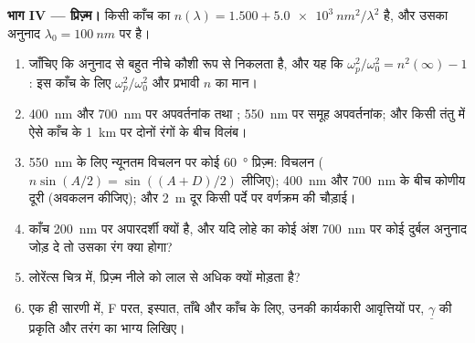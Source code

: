 \begin{problem}
\medskip
\noindent\textbf{भाग IV --- प्रिज़्म।}
किसी काँच का $n(\lambda) = 1.500 + \qty{5.0e3}{nm^2}/\lambda^2$ है, और उसका अनुनाद
$\lambda_0 = \qty{100}{nm}$ पर है।
\begin{enumerate}[resume]
  \item जाँचिए कि अनुनाद से बहुत नीचे कौशी रूप  से
        निकलता है, और यह कि $\omega_p^2/\omega_0^2 = n^2(\infty) - 1$: इस काँच के लिए
        $\omega_p^2/\omega_0^2$ और प्रभावी $n$ का मान।
  \item \qty{400}{nm} और \qty{700}{nm} पर अपवर्तनांक तथा ;
        \qty{550}{nm} पर समूह अपवर्तनांक; और किसी तंतु में ऐसे काँच के
        \qty{1}{km} पर दोनों रंगों के बीच विलंब।
  \item \qty{550}{nm} के लिए न्यूनतम विचलन पर कोई \qty{60}{\degree} प्रिज़्म:
        विचलन ($n\sin(A/2) = \sin((A + D)/2)$ लीजिए); \qty{400}{nm} और
        \qty{700}{nm} के बीच कोणीय दूरी (अवकलन कीजिए); और \qty{2}{m}
        दूर किसी पर्दे पर वर्णक्रम की चौड़ाई।
  \item काँच \qty{200}{nm} पर अपारदर्शी क्यों है, और यदि लोहे का कोई अंश
        \qty{700}{nm} पर कोई दुर्बल अनुनाद जोड़ दे तो उसका रंग क्या होगा?
  \item लोरेंत्स चित्र में, प्रिज़्म नीले को लाल से अधिक क्यों मोड़ता है?
  \item एक ही सारणी में, F परत, इस्पात, ताँबे और काँच के लिए,
        उनकी कार्यकारी आवृत्तियों पर, $\underline\gamma$ की प्रकृति और तरंग का
        भाग्य लिखिए।
\end{enumerate}
\end{problem}
